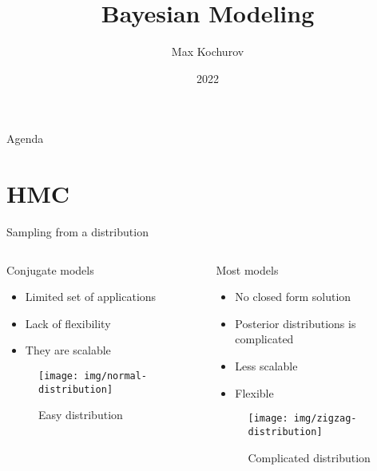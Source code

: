 \documentclass{beamer}
\author{Max Kochurov}
\title[Practical Bayes - Bayesian Modeling]{Bayesian Modeling}
\date{2022}
\institute[MSU]{Moscow State University}
\begin{document}
\begin{frame}
	\maketitle
\end{frame}
\begin{frame}{Agenda}
\tableofcontents
\end{frame}
\section{HMC}
\begin{frame}{Sampling from a distribution}
    \begin{columns}[t]
    \begin{column}{0.5\linewidth}
    Conjugate models
    \begin{itemize}
        \item Limited set of applications
        \item Lack of flexibility
        \item They are scalable
    \end{itemize}
    \begin{figure}
        \centering
        \texttt{[image: img/normal-distribution]}
        \caption{Easy distribution}
    \end{figure}
    \end{column}
    \begin{column}{0.5\linewidth}
    Most models
    \begin{itemize}
        \item No closed form solution
        \item Posterior distributions is complicated
        \item Less scalable
        \item Flexible
    \end{itemize}
    \begin{figure}
        \centering
        \texttt{[image: img/zigzag-distribution]}
        \caption{Complicated distribution}
    \end{figure}
    \end{column}
    \end{columns}
\end{frame}
\end{document}
